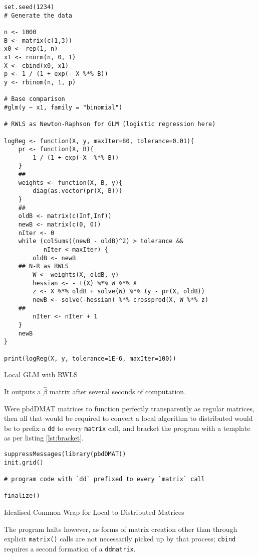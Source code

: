 \begin{listing}
	\begin{verbatim}
set.seed(1234)
# Generate the data

n <- 1000
B <- matrix(c(1,3))
x0 <- rep(1, n)
x1 <- rnorm(n, 0, 1)
X <- cbind(x0, x1)
p <- 1 / (1 + exp(- X %*% B))
y <- rbinom(n, 1, p)

# Base comparison
#glm(y ~ x1, family = "binomial")

# RWLS as Newton-Raphson for GLM (logistic regression here)

logReg <- function(X, y, maxIter=80, tolerance=0.01){
	pr <- function(X, B){
		1 / (1 + exp(-X  %*% B))
	}
	##
	weights <- function(X, B, y){
		diag(as.vector(pr(X, B)))
	}
	##
	oldB <- matrix(c(Inf,Inf))
	newB <- matrix(c(0, 0))
	nIter <- 0
	while (colSums((newB - oldB)^2) > tolerance &&
	       nIter < maxIter) {
		oldB <- newB
	## N-R as RWLS
		W <- weights(X, oldB, y)
		hessian <- - t(X) %*% W %*% X
		z <- X %*% oldB + solve(W) %*% (y - pr(X, oldB))
		newB <- solve(-hessian) %*% crossprod(X, W %*% z)
	##
		nIter <- nIter + 1
	}
	newB
}

print(logReg(X, y, tolerance=1E-6, maxIter=100))
\end{verbatim}
	\caption{Local GLM with RWLS}
	\label{lst:local-rwls}
\end{listing}

It outputs a \(\hat{\beta}\) matrix after several seconds of
computation.

Were pbdDMAT matrices to function perfectly transparently as regular
matrices, then all that would be required to convert a local algorithm
to distributed would be to prefix a \texttt{dd} to every \texttt{matrix}
call, and bracket the program with a template as per listing
\ref{lst:bracket}.

\begin{listing}
	\begin{verbatim}
suppressMessages(library(pbdDMAT))
init.grid()

# program code with `dd` prefixed to every `matrix` call

finalize()
\end{verbatim}
	\caption{Idealised Common Wrap for Local to Distributed Matrices}
	\label{lst:bracket}
\end{listing}

The program halts however, as forms of matrix creation other than
through explicit \texttt{matrix()} calls
are not necessarily picked up by that process; \texttt{cbind} requires a
second formation of a \texttt{ddmatrix}.

